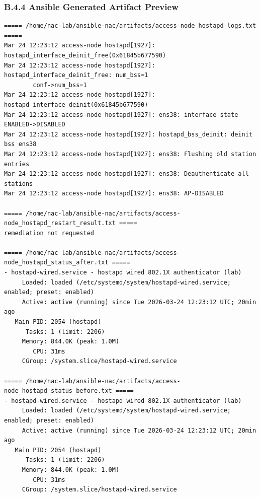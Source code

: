 \documentclass[11pt]{article}
\begin{document}

\subsubsection{B.4.4 Ansible Generated Artifact Preview}
\label{sec:appendix-b-ansible-generated-artifact-preview}

\begin{verbatim}
===== /home/nac-lab/ansible-nac/artifacts/access-node_hostapd_logs.txt =====
Mar 24 12:23:12 access-node hostapd[1927]: hostapd_interface_deinit_free(0x61845b677590)
Mar 24 12:23:12 access-node hostapd[1927]: hostapd_interface_deinit_free: num_bss=1 
        conf->num_bss=1
Mar 24 12:23:12 access-node hostapd[1927]: hostapd_interface_deinit(0x61845b677590)
Mar 24 12:23:12 access-node hostapd[1927]: ens38: interface state ENABLED->DISABLED
Mar 24 12:23:12 access-node hostapd[1927]: hostapd_bss_deinit: deinit bss ens38
Mar 24 12:23:12 access-node hostapd[1927]: ens38: Flushing old station entries
Mar 24 12:23:12 access-node hostapd[1927]: ens38: Deauthenticate all stations
Mar 24 12:23:12 access-node hostapd[1927]: ens38: AP-DISABLED

===== /home/nac-lab/ansible-nac/artifacts/access-node_hostapd_restart_result.txt =====
remediation not requested

===== /home/nac-lab/ansible-nac/artifacts/access-node_hostapd_status_after.txt =====
- hostapd-wired.service - hostapd wired 802.1X authenticator (lab)
     Loaded: loaded (/etc/systemd/system/hostapd-wired.service; enabled; preset: enabled)
     Active: active (running) since Tue 2026-03-24 12:23:12 UTC; 20min ago
   Main PID: 2054 (hostapd)
      Tasks: 1 (limit: 2206)
     Memory: 844.0K (peak: 1.0M)
        CPU: 31ms
     CGroup: /system.slice/hostapd-wired.service

===== /home/nac-lab/ansible-nac/artifacts/access-node_hostapd_status_before.txt =====
- hostapd-wired.service - hostapd wired 802.1X authenticator (lab)
     Loaded: loaded (/etc/systemd/system/hostapd-wired.service; enabled; preset: enabled)
     Active: active (running) since Tue 2026-03-24 12:23:12 UTC; 20min ago
   Main PID: 2054 (hostapd)
      Tasks: 1 (limit: 2206)
     Memory: 844.0K (peak: 1.0M)
        CPU: 31ms
     CGroup: /system.slice/hostapd-wired.service


\end{verbatim}
\end{document}
